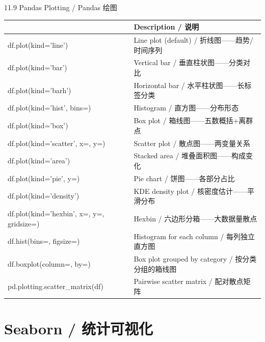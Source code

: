 \documentclass[11pt,a4paper]{report}
\begin{document}
\begin{cmdsection}{11.9  Pandas Plotting / Pandas 绘图}
\normalsize\renewcommand{\arraystretch}{1.4}
\centering
\begin{tabularx}{\textwidth}{@{}>{\ttfamily}l>{\raggedright\arraybackslash}X@{}}
\toprule
\multicolumn{1}{@{}l}{\textbf{Syntax}} & \textbf{Description / 说明} \\ \midrule
df.plot(kind='line')        & Line plot (default) / 折线图——趋势/时间序列 \\
df.plot(kind='bar')         & Vertical bar / 垂直柱状图——分类对比 \\
df.plot(kind='barh')        & Horizontal bar / 水平柱状图——长标签分类 \\
df.plot(kind='hist', bins=) & Histogram / 直方图——分布形态 \\
df.plot(kind='box')         & Box plot / 箱线图——五数概括+离群点 \\
df.plot(kind='scatter', x=, y=) & Scatter plot / 散点图——两变量关系 \\
df.plot(kind='area')        & Stacked area / 堆叠面积图——构成变化 \\
df.plot(kind='pie', y=)     & Pie chart / 饼图——各部分占比 \\
df.plot(kind='density')     & KDE density plot / 核密度估计——平滑分布 \\
df.plot(kind='hexbin', x=, y=, gridsize=) & Hexbin / 六边形分箱——大数据量散点 \\
df.hist(bins=, figsize=)    & Histogram for each column / 每列独立直方图 \\
df.boxplot(column=, by=)    & Box plot grouped by category / 按分类分组的箱线图 \\
pd.plotting.scatter\_matrix(df) & Pairwise scatter matrix / 配对散点矩阵 \\
\bottomrule
\end{tabularx}
\end{cmdsection}

\newpage


\chapter{Seaborn / 统计可视化}
\end{document}
